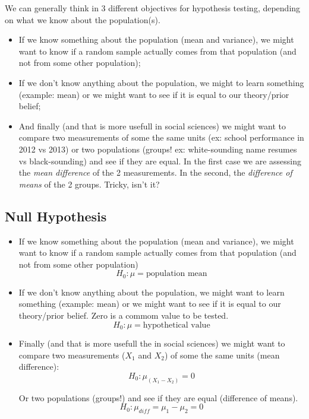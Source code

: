 \documentclass[11pt]{article}
\begin{document}
	We can generally think in 3 different objectives for hypothesis testing, depending on what we know about the population(s).
	\begin{itemize}
		\item If we know something about the population (mean and variance), we might want to know if a random sample actually comes from that population (and not from some other population);
		\item If we don't know anything about the population, we might to learn something (example: mean) or we might want to see if it is equal to our theory/prior belief;
		\item And finally (and that is more usefull in social sciences) we might want to compare two measurements of some the same units (ex: school performance in 2012 vs 2013) or two populations (groups! ex: white-sounding name resumes vs black-sounding) and see if they are equal. In the first case we are assessing the \emph{mean difference} of the 2 measurements. In the second, the \emph{difference of means} of the 2 groups. Tricky, isn't it?
	\end{itemize}

	\subsection*{Null Hypothesis}

	\begin{itemize}
		\item If we know something about the population (mean and variance), we might want to know if a random sample actually comes from that population (and not from some other population)
		\[H_0: \mu = \text{population mean}\]
		\item If we don't know anything about the population, we might want to learn something (example: mean) or we might want to see if it is equal to our theory/prior belief. Zero is a commom value to be tested.
		\[H_0: \mu = \text{hypothetical value} \]
		\item Finally (and that is more usefull the in social sciences) we might want to compare two measurements ($X_1$ and $X_2$) of some the same units (mean difference): 
		\[H_0: \mu_{(X_1 - X_2)} = 0\]
		
		Or two populations (groups!) and see if they are equal (difference of means).
		\[H_0: \mu_{diff} = \mu_1 - \mu_2 = 0\]
	\end{itemize}
\end{document}
